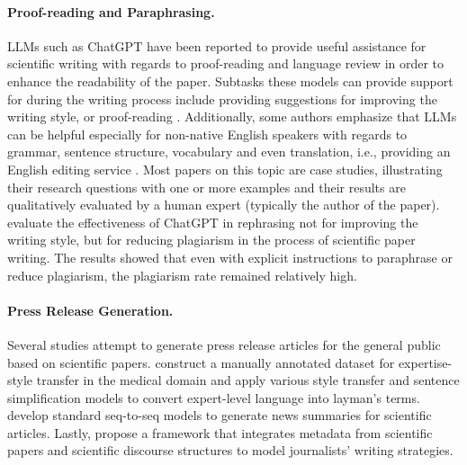 \paragraph{Proof-reading and Paraphrasing.} %
LLMs such as ChatGPT have been reported to provide useful assistance for scientific writing with regards to proof-reading and language review in order to enhance the readability of the paper. Subtasks these models can provide support for during the writing process include providing suggestions for improving the writing style, or proof-reading \cite{salvagno2023can}. Additionally, some authors emphasize that LLMs %
can be helpful especially for non-native English speakers with regards to grammar, sentence structure, vocabulary and even translation, i.e., providing an English editing service \cite{huang2023role,castellanos2023good,kim2023using}. Most papers on this topic are case studies, illustrating their research questions with one or more examples and their results are qualitatively evaluated by a human expert (typically the author of the paper). \citet{hassanipour2024ability} evaluate the effectiveness of ChatGPT in rephrasing not for improving the writing style, but for reducing plagiarism in the process of scientific paper writing. The results showed that even with explicit instructions to paraphrase or reduce plagiarism, the plagiarism rate remained relatively high.


\paragraph{Press Release Generation.}  Several studies attempt to generate press release articles for the general public based on scientific papers. \citet{cao-etal-2020-expertise} construct a manually annotated dataset for expertise-style transfer in the medical domain and apply various style transfer and sentence simplification models to convert expert-level language into layman’s terms. \citet{goldsack-etal-2022-making} develop standard seq-to-seq models to generate news summaries for scientific articles. Lastly, \citet{cardenas-etal-2023-dont} propose a framework that integrates metadata from scientific papers and scientific discourse structures to model journalists’ writing strategies. %


